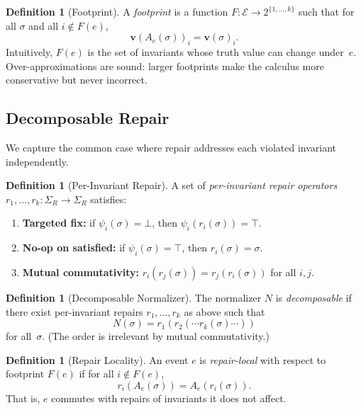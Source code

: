 \documentclass[11pt,a4paper]{article}
\theoremstyle{plain}
\theoremstyle{definition}
\newtheorem{definition}[theorem]{Definition}
\theoremstyle{remark}
\renewcommand{\_}{\textunderscore\allowbreak}
\begin{document}
\begin{definition}[Footprint]
\label{def:footprint}
A \emph{footprint} is a function $F: \mathcal{E} \to 2^{\{1,\ldots,k\}}$ such
that for all $\sigma$ and all $i \notin F(e)$,
\[
\mathbf{v}(A_e(\sigma))_i = \mathbf{v}(\sigma)_i.
\]
Intuitively, $F(e)$ is the set of invariants whose truth value can change
under~$e$.  Over-approximations are sound: larger footprints make the calculus
more conservative but never incorrect.
\end{definition}

\subsection{Decomposable Repair}

We capture the common case where repair addresses each violated invariant
independently.

\begin{definition}[Per-Invariant Repair]
\label{def:perinv}
A set of \emph{per-invariant repair operators} $r_1, \ldots, r_k :
\Sigma_R \to \Sigma_R$ satisfies:
\begin{enumerate}[leftmargin=*,nosep,label=(R\arabic*)]
\item \textbf{Targeted fix:}\; if $\psi_i(\sigma) = \bot$, then
  $\psi_i(r_i(\sigma)) = \top$.
\item \textbf{No-op on satisfied:}\; if $\psi_i(\sigma) = \top$, then
  $r_i(\sigma) = \sigma$.
\item \textbf{Mutual commutativity:}\; $r_i(r_j(\sigma)) = r_j(r_i(\sigma))$
  for all $i, j$.
\end{enumerate}
\end{definition}

\begin{definition}[Decomposable Normalizer]
\label{def:decomp}
The normalizer $N$ is \emph{decomposable} if there exist per-invariant repairs
$r_1, \ldots, r_k$ as above such that
\[
N(\sigma) = r_1(r_2(\cdots r_k(\sigma) \cdots))
\]
for all~$\sigma$.  (The order is irrelevant by mutual commutativity.)
\end{definition}

\begin{definition}[Repair Locality]
\label{def:repair-locality}
An event $e$ is \emph{repair-local} with respect to footprint $F(e)$ if for
all $i \notin F(e)$,
\[
r_i(A_e(\sigma)) = A_e(r_i(\sigma)).
\]
That is, $e$ commutes with repairs of invariants it does not affect.
\end{definition}
\end{document}

